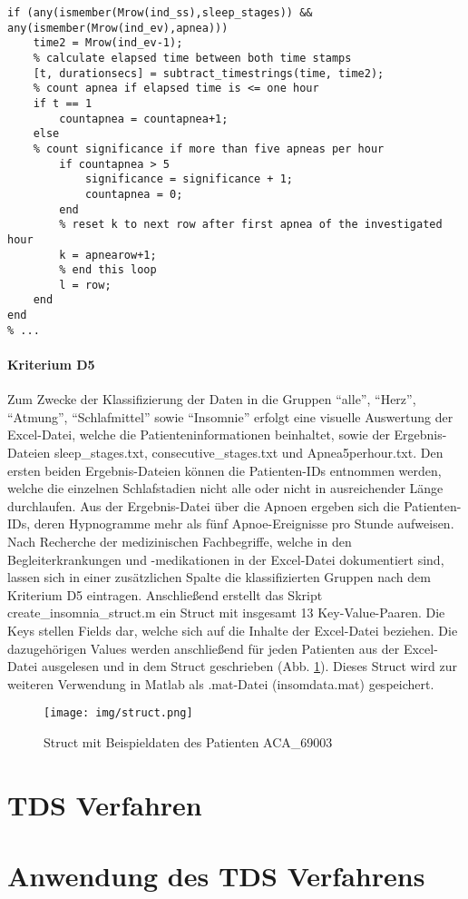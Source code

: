 \begin{lstlisting}[caption={Implementierung Kriterium D4 in Skript check\_apneas5.m}, label={lst:D4apnea5}]
% ...
if (any(ismember(Mrow(ind_ss),sleep_stages)) && any(ismember(Mrow(ind_ev),apnea)))
    time2 = Mrow(ind_ev-1);
    % calculate elapsed time between both time stamps
    [t, durationsecs] = subtract_timestrings(time, time2);
    % count apnea if elapsed time is <= one hour
    if t == 1
        countapnea = countapnea+1;
    else
    % count significance if more than five apneas per hour
        if countapnea > 5
            significance = significance + 1;
            countapnea = 0;
        end
        % reset k to next row after first apnea of the investigated hour
        k = apnearow+1;
        % end this loop
        l = row;
    end
end
% ...
\end{lstlisting}

\paragraph{Kriterium D5} Zum Zwecke der Klassifizierung der Daten in die Gruppen "`alle"', "`Herz"', "`Atmung"', "`Schlafmittel"' sowie "`Insomnie"' erfolgt eine visuelle Auswertung der Excel-Datei, welche die Patienteninformationen beinhaltet, sowie der Ergebnis-Dateien sleep\_stages.txt, consecutive\_stages.txt und Apnea5perhour.txt. Den ersten beiden Ergebnis-Dateien können die Patienten-IDs entnommen werden, welche die einzelnen Schlafstadien nicht alle oder nicht in ausreichender Länge durchlaufen. Aus der Ergebnis-Datei über die Apnoen ergeben sich die Patienten-IDs, deren Hypnogramme mehr als fünf Apnoe-Ereignisse pro Stunde aufweisen. Nach Recherche der medizinischen Fachbegriffe, welche in den Begleiterkrankungen und -medikationen in der Excel-Datei dokumentiert sind, lassen sich in einer zusätzlichen Spalte die klassifizierten Gruppen nach dem Kriterium D5 eintragen. Anschließend erstellt das Skript create\_insomnia\_struct.m ein Struct mit insgesamt 13 Key-Value-Paaren. Die Keys stellen Fields dar, welche sich auf die Inhalte der Excel-Datei beziehen. Die dazugehörigen Values werden anschließend für jeden Patienten aus der Excel-Datei ausgelesen und in dem Struct geschrieben (Abb. \ref{fig:struct}). Dieses Struct wird zur weiteren Verwendung in Matlab als .mat-Datei (insomdata.mat) gespeichert.

\begin{figure}[H]
	\centering
	\texttt{[image: img/struct.png]}
	\caption[Struct mit Beispieldaten]{Struct mit Beispieldaten des Patienten ACA\_69003}
	\label{fig:struct}
\end{figure}

\section{\acs{TDS} Verfahren}\label{tdsVerfahren}

\section{Anwendung des \acs{TDS} Verfahrens}

